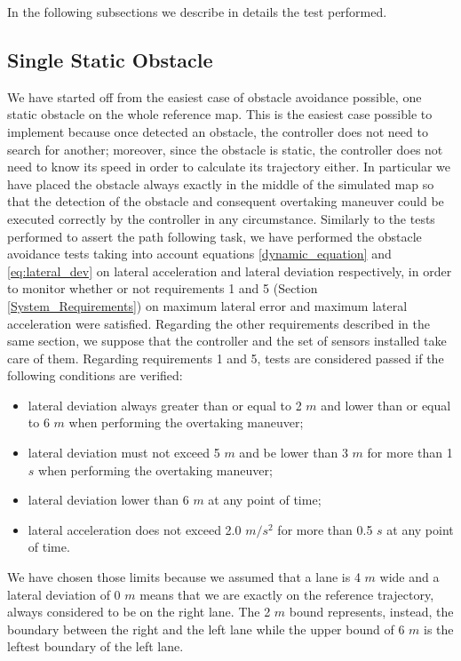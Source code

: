 In the following subsections we describe in details the test performed.

\subsection{Single Static Obstacle}
\label{sub:single_static_obstacle}
We have started off from the easiest case of obstacle avoidance possible, one static obstacle on the whole reference map. This is the easiest case possible to implement because once detected an obstacle, the controller does not need to search for another; moreover, since the obstacle is static, the controller does not need to know its speed in order to calculate its trajectory either.
In particular we have placed the obstacle always exactly in the middle of the simulated map so that the detection of the obstacle and consequent overtaking maneuver could be executed correctly by the controller in any circumstance.
Similarly to the tests performed to assert the path following task, we have performed the obstacle avoidance tests taking into account equations \ref{dynamic_equation} and \ref{eq:lateral_dev} on lateral acceleration and lateral deviation respectively, in order to monitor whether or not requirements 1 and 5 (Section \ref{System_Requirements}) on maximum lateral error and maximum lateral acceleration were satisfied.
Regarding the other requirements described in the same section, we suppose that the controller and the set of sensors installed take care of them.
Regarding requirements 1 and 5, tests are considered passed if the following conditions are verified:
\begin{itemize}
    \item lateral deviation always greater than or equal to 2 $m$ and lower than or equal to 6 $m$ when performing the overtaking maneuver;
    \item  lateral deviation must not exceed 5 $m$ and be lower than 3 $m$ for more than 1 $s$ when performing the overtaking maneuver; 
    \item lateral deviation lower than 6 $m$ at any point of time;
    \item lateral acceleration does not exceed 2.0 $m/s^2$ for more than 0.5 $s$ at any point of time.
\end{itemize}
We have chosen those limits because we assumed that a lane is 4 $m$ wide and a lateral deviation of 0 $m$ means that we are exactly on the reference trajectory, always considered to be on the right lane. The 2 $m$ bound represents, instead, the boundary between the right and the left lane while the upper bound of 6 $m$ is the leftest boundary of the left lane.
